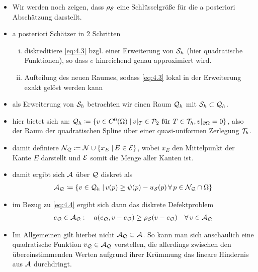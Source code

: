 \begin{itemize}
\item
\begin{bem*}
Wir werden noch zeigen, dass $\rho_{\mathcal S}$ eine Schlüsselgröße für die a posteriori Abschätzung darstellt.
\end{bem*}

\item a posteriori Schätzer in 2 Schritten
\begin{enumerate}[(i)]
\item	diskreditiere \eqref{eq:4.3} bzgl. einer Erweiterung von $\mathcal S_h$ (hier quadratische Funktionen), so dass $e$ hinreichend genau approximiert wird.
\item Aufteilung des neuen Raumes, sodass \eqref{eq:4.3} lokal in der Erweiterung exakt gelöst werden kann
\end{enumerate}

\item als Erweiterung von $\mathcal S_h$ betrachten wir einen Raum $\mathcal Q_h$ mit $\mathcal S_h \subset \mathcal Q_h$.

\item hier bietet sich an: $\mathcal Q_h \coloneqq \{v \in C^0(\Omega) \;\vert\, v|_T \in \mathcal P_2 \text{ für } T\in \mathcal T_h, v|_{\partial\Omega} = 0\}$, also der Raum der quadratischen Spline über einer quasi-uniformen Zerlegung $\mathcal T_h$.

\item damit definiere $\mathcal N_{\mathcal Q} \coloneqq \mathcal N \cup \{x_E \;\vert\, E \in \mathcal E\}$, wobei $x_E$ den Mittelpunkt der Kante $E$ darstellt und $\mathcal E$ somit die Menge aller Kanten ist.

\item damit ergibt sich $\mathcal A$ über $\mathcal Q$ diskret als
\begin{align}\label{eq:4.4}
	\mathcal A_{\mathcal Q} \coloneqq \{v \in \mathcal Q_h \;\vert\, v(p) \ge \psi(p)-u_{\mathcal S}(p) \, \forall \, p \in \mathcal N_{\mathcal Q} \cap \Omega\}
\end{align}

\item im Bezug zu \eqref{eq:4.4} ergibt sich dann das diskrete Defektproblem
\begin{align}\label{eq:4.5}
	e_{\mathcal Q} \in \mathcal A_{\mathcal Q} : \quad a(e_{\mathcal Q}, v-e_{\mathcal Q}) \ge \rho_{\mathcal S}(v-e_{\mathcal Q}) \quad \forall \, v \in \mathcal A_{\mathcal Q}
\end{align}

\item 
\begin{bem}
Im Allgemeinen gilt hierbei nicht $\mathcal A_{\mathcal Q} \subset \mathcal A$. So kann man sich anschaulich eine quadratische Funktion $v_{\mathcal Q} \in \mathcal A_{\mathcal Q}$ vorstellen, die allerdings zwischen den übereinstimmenden Werten aufgrund ihrer Krümmung das lineare Hindernis aus $\mathcal A$ durchdringt.


\end{bem}
\end{itemize}
